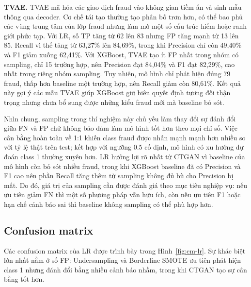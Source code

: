 \documentclass[12pt,a4paper]{article}
\begin{document}
\textbf{TVAE.} TVAE mã hóa các giao dịch fraud vào không gian tiềm ẩn và sinh mẫu thông qua decoder. Cơ chế tái tạo thường tạo phân bố trơn hơn, có thể bao phủ các vùng trung tâm của lớp fraud nhưng làm mờ một số cấu trúc hiếm hoặc ranh giới phức tạp. Với LR, số TP tăng từ 62 lên 83 nhưng FP tăng mạnh từ 13 lên 85. Recall vì thế tăng từ 63,27\% lên 84,69\%, trong khi Precision chỉ còn 49,40\% và F1 giảm xuống 62,41\%. Với XGBoost, TVAE tạo ít FP nhất trong nhóm có sampling, chỉ 15 trường hợp, nên Precision đạt 84,04\% và F1 đạt 82,29\%, cao nhất trong riêng nhóm sampling. Tuy nhiên, mô hình chỉ phát hiện đúng 79 fraud, thấp hơn baseline một trường hợp, nên Recall giảm còn 80,61\%. Kết quả này gợi ý các mẫu TVAE giúp XGBoost giữ biên quyết định tương đối thận trọng nhưng chưa bổ sung được những kiểu fraud mới mà baseline bỏ sót.

Nhìn chung, sampling trong thí nghiệm này chủ yếu làm thay đổi sự đánh đổi giữa FN và FP chứ không bảo đảm làm mô hình tốt hơn theo mọi chỉ số. Việc cân bằng hoàn toàn về 1:1 khiến class fraud được nhấn mạnh mạnh hơn nhiều so với tỷ lệ thật trên test; kết hợp với ngưỡng 0.5 cố định, mô hình có xu hướng dự đoán class 1 thường xuyên hơn. LR hưởng lợi rõ nhất từ CTGAN vì baseline của mô hình còn bỏ sót nhiều fraud, trong khi XGBoost baseline đã có Precision và F1 cao nên phần Recall tăng thêm từ sampling không đủ bù cho Precision bị mất. Do đó, giá trị của sampling cần được đánh giá theo mục tiêu nghiệp vụ: nếu ưu tiên giảm FN thì một số phương pháp vẫn hữu ích, còn nếu ưu tiên F1 hoặc hạn chế cảnh báo sai thì baseline không sampling có thể phù hợp hơn.

\subsection{Confusion matrix}

Các confusion matrix của LR được trình bày trong Hình~\ref{fig:cm-lr}. Sự khác biệt lớn nhất nằm ở số FP: Undersampling và Borderline-SMOTE ưu tiên phát hiện class 1 nhưng đánh đổi bằng nhiều cảnh báo nhầm, trong khi CTGAN tạo sự cân bằng tốt hơn.
\end{document}
